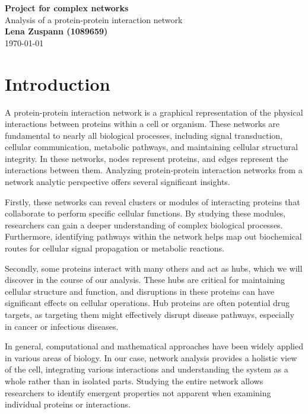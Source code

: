 \documentclass[paper=a4,fontsize=11pt,DIV=8,BCOR=5mm,oneside,pdftex,bibtotocnumbered]{scrreprt}
\theoremstyle{plain}
\begin{document}
	\begin{titlepage}
		\begin{center}
			\Huge \textsf{\textbf{Project for complex networks}}
			\\
			\Large \textsf{Analysis of a protein-protein interaction network}
			\\[1.4cm]
			\Large \textsf{\textbf{Lena Zuspann (1089659)}}
			\\[1.4cm]
			\today
		\end{center}
	\end{titlepage}
	
	\setcounter{page}{1}
	\tableofcontents
	
	\chapter{Introduction}\label{ch:into}
	A protein-protein interaction network is a graphical representation of the physical interactions between proteins within a cell or organism. These networks are fundamental to nearly all biological processes, including signal transduction, cellular communication, metabolic pathways, and maintaining cellular structural integrity. In these networks, nodes represent proteins, and edges represent the interactions between them. Analyzing protein-protein interaction networks from a network analytic perspective offers several significant insights.
	
	Firstly, these networks can reveal clusters or modules of interacting proteins that collaborate to perform specific cellular functions. By studying these modules, researchers can gain a deeper understanding of complex biological processes. Furthermore, identifying pathways within the network helps map out biochemical routes for cellular signal propagation or metabolic reactions.
	
	Secondly, some proteins interact with many others and act as hubs, which we will discover in the course of our analysis. These hubs are critical for maintaining cellular structure and function, and disruptions in these proteins can have significant effects on cellular operations. Hub proteins are often potential drug targets, as targeting them might effectively disrupt disease pathways, especially in cancer or infectious diseases.
	
	In general, computational and mathematical approaches have been widely applied in various areas of biology. In our case, network analysis provides a holistic view of the cell, integrating various interactions and understanding the system as a whole rather than in isolated parts. Studying the entire network allows researchers to identify emergent properties not apparent when examining individual proteins or interactions.
	
\end{document}
